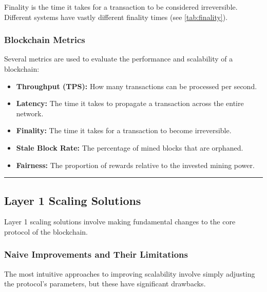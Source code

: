 Finality is the time it takes for a transaction to be considered
irreversible. Different systems have vastly different finality times (see \autoref{tab:finality}).



\subsubsection{Blockchain Metrics}\label{blockchain-metrics}

Several metrics are used to evaluate the performance and scalability of
a blockchain:

\begin{itemize}
\tightlist
\item
  \textbf{Throughput (TPS):} How many transactions can be processed per
  second.
\item
  \textbf{Latency:} The time it takes to propagate a transaction across
  the entire network.
\item
  \textbf{Finality:} The time it takes for a transaction to become
  irreversible.
\item
  \textbf{Stale Block Rate:} The percentage of mined blocks that are
  orphaned.
\item
  \textbf{Fairness:} The proportion of rewards relative to the invested
  mining power.
\end{itemize}

\begin{center}\rule{0.5\linewidth}{0.5pt}\end{center}

\subsection{Layer 1 Scaling
Solutions}\label{section-3-layer-1-scaling-solutions}

Layer 1 scaling solutions involve making fundamental changes to the core
protocol of the blockchain.

\subsubsection{Naive Improvements and Their
Limitations}\label{naive-improvements-and-their-limitations}

The most intuitive approaches to improving scalability involve simply
adjusting the protocol's parameters, but these have significant
drawbacks.

